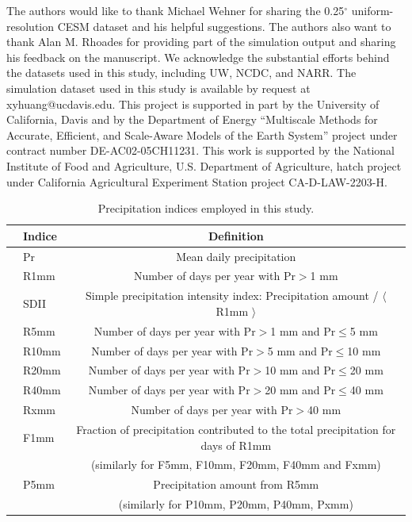 \documentclass{ametsoc}
\begin{document}
\acknowledgments

The authors would like to thank Michael Wehner for sharing the 0.25$^\circ$ uniform-resolution CESM dataset and his helpful suggestions. The authors also want to thank Alan M. Rhoades for providing part of the simulation output and sharing his feedback on the manuscript. We acknowledge the substantial efforts behind the datasets used in this study, including UW, NCDC, and NARR. The simulation dataset used in this study is available by request at xyhuang@ucdavis.edu. This project is supported in part by the University of California, Davis and by the Department of Energy ``Multiscale Methods for Accurate, Efficient, and Scale-Aware Models of the Earth System'' project under contract number DE-AC02-05CH11231. This work is supported by the National Institute of Food and Agriculture, U.S. Department of Agriculture, hatch project under California Agricultural Experiment Station project CA-D-LAW-2203-H.

 
  




\begin{table}
\begin{center}
\caption{Precipitation indices employed in this study.} \label{tab:table1}
\begin{tabular*}{5.0in}{l @{\extracolsep{\fill}}lc}
\hline \textbf{} & \textbf{Indice} & \textbf{Definition} \\
\hline & Pr & Mean daily precipitation \\
\hline & R1mm & Number of days per year with Pr$>$1 mm \\
\hline & SDII & Simple precipitation intensity index: Precipitation amount / $\langle$ R1mm $\rangle$ \\
\hline & R5mm & Number of days per year with Pr$>$1 mm and Pr$\leq$5 mm\\
\hline & R10mm & Number of days per year with Pr$>$5 mm and Pr$\leq$10 mm\\
\hline & R20mm & Number of days per year with Pr$>$10 mm and Pr$\leq$20 mm\\
\hline & R40mm & Number of days per year with Pr$>$20 mm and Pr$\leq$40 mm\\
\hline & Rxmm & Number of days per year with Pr$>$40 mm\\
\hline & F1mm & Fraction of precipitation contributed to the total precipitation for days of R1mm\\ 
 & & (similarly for F5mm, F10mm, F20mm,  F40mm and Fxmm) \\
\hline & P5mm & Precipitation amount from R5mm \\
 & & (similarly for P10mm, P20mm, P40mm,  Pxmm) \\
\hline 
\end{tabular*}
\end{center}
\end{table}
\end{document}
